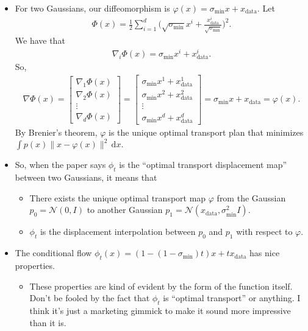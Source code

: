 \documentclass[10pt]{article}
\newcommand{\dee}{\mathrm{d}}
\newcommand{\mcal}[1]{\mathcal{#1}}
\newcommand{\data}{\mathrm{data}}
\begin{document}
\begin{itemize}
  \item For two Gaussians, our diffeomorphism is $\varphi(x) = \sigma_{\min} x + x_{\data}$. Let
  \begin{align*}
    \Phi(x) = \frac{1}{2} \sum_{i=1}^d \bigg(\sqrt{\sigma_{\min}} x^i + \frac{x^i_{\data}}{\sqrt{\sigma_{\min}}} \bigg)^2.
  \end{align*}
  We have that
  \begin{align*}
    \nabla_i \Phi(x) = \sigma_{\min} x^i + x^i_{\data}.
  \end{align*}
  So,
  \begin{align*}
    \nabla \Phi(x) = \begin{bmatrix}
      \nabla_1 \Phi(x) \\
      \nabla_2 \Phi(x) \\
      \vdots \\
      \nabla_d \Phi(x)
    \end{bmatrix}
    = \begin{bmatrix}
      \sigma_{\min} x^1 + x^1_{\data} \\
      \sigma_{\min} x^2 + x^2_{\data} \\
      \vdots \\
      \sigma_{\min} x^d + x^d_{\data} 
    \end{bmatrix}
    = \sigma_{\min} x + x_{\data}
    = \varphi(x).
  \end{align*}
  By Brenier's theorem, $\varphi$ is the unique optimal transport plan that minimizes $\int p(x) \| x - \varphi(x) \|^2\, \dee x$.

  \item So, when the paper says $\phi_t$ is the ``optimal transport displacement map'' between two Gaussians, it means that
  \begin{itemize}
    \item There exists the unique optimal transport map $\varphi$ from the Gaussian $p_0 = \mcal{N}(0,I)$ to another Gaussian $p_1 = \mcal{N}(x_{\data},\sigma_{\min}^2 I)$.
    \item $\phi_t$ is the displacement interpolation between $p_0$ and $p_1$ with respect to $\varphi$.
  \end{itemize}

  \item The conditional flow $\phi_t(x) = (1 - (1-\sigma_{\min})t) x + tx_{\data}$ has nice properties.
  \begin{itemize}
    \item These properties are kind of evident by the form of the function itself. Don't be fooled by the fact that $\phi_t$ is ``optimal transport'' or anything. I think it's just a marketing gimmick to make it sound more impressive than it is.
    

\end{itemize}
\end{itemize}
\end{document}
